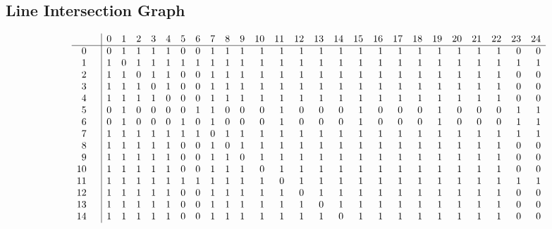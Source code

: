 \documentclass{article}
\begin{document}
{\subsection*{Line Intersection Graph}
{\arraycolsep=1pt
$$
\begin{array}{rr|*{25}r}
 &  & 0 & 1 & 2 & 3 & 4 & 5 & 6 & 7 & 8 & 9 & 10 & 11 & 12 & 13 & 14 & 15 & 16 & 17 & 18 & 19 & 20 & 21 & 22 & 23 & 24\\
\hline
0 &  & 0 & 1 & 1 & 1 & 1 & 0 & 0 & 1 & 1 & 1 & 1 & 1 & 1 & 1 & 1 & 1 & 1 & 1 & 1 & 1 & 1 & 1 & 1 & 0 & 0\\
1 &  & 1 & 0 & 1 & 1 & 1 & 1 & 1 & 1 & 1 & 1 & 1 & 1 & 1 & 1 & 1 & 1 & 1 & 1 & 1 & 1 & 1 & 1 & 1 & 1 & 1\\
2 &  & 1 & 1 & 0 & 1 & 1 & 0 & 0 & 1 & 1 & 1 & 1 & 1 & 1 & 1 & 1 & 1 & 1 & 1 & 1 & 1 & 1 & 1 & 1 & 0 & 0\\
3 &  & 1 & 1 & 1 & 0 & 1 & 0 & 0 & 1 & 1 & 1 & 1 & 1 & 1 & 1 & 1 & 1 & 1 & 1 & 1 & 1 & 1 & 1 & 1 & 0 & 0\\
4 &  & 1 & 1 & 1 & 1 & 0 & 0 & 0 & 1 & 1 & 1 & 1 & 1 & 1 & 1 & 1 & 1 & 1 & 1 & 1 & 1 & 1 & 1 & 1 & 0 & 0\\
5 &  & 0 & 1 & 0 & 0 & 0 & 0 & 1 & 1 & 0 & 0 & 0 & 1 & 0 & 0 & 0 & 1 & 0 & 0 & 0 & 1 & 0 & 0 & 0 & 1 & 1\\
6 &  & 0 & 1 & 0 & 0 & 0 & 1 & 0 & 1 & 0 & 0 & 0 & 1 & 0 & 0 & 0 & 1 & 0 & 0 & 0 & 1 & 0 & 0 & 0 & 1 & 1\\
7 &  & 1 & 1 & 1 & 1 & 1 & 1 & 1 & 0 & 1 & 1 & 1 & 1 & 1 & 1 & 1 & 1 & 1 & 1 & 1 & 1 & 1 & 1 & 1 & 1 & 1\\
8 &  & 1 & 1 & 1 & 1 & 1 & 0 & 0 & 1 & 0 & 1 & 1 & 1 & 1 & 1 & 1 & 1 & 1 & 1 & 1 & 1 & 1 & 1 & 1 & 0 & 0\\
9 &  & 1 & 1 & 1 & 1 & 1 & 0 & 0 & 1 & 1 & 0 & 1 & 1 & 1 & 1 & 1 & 1 & 1 & 1 & 1 & 1 & 1 & 1 & 1 & 0 & 0\\
10 &  & 1 & 1 & 1 & 1 & 1 & 0 & 0 & 1 & 1 & 1 & 0 & 1 & 1 & 1 & 1 & 1 & 1 & 1 & 1 & 1 & 1 & 1 & 1 & 0 & 0\\
11 &  & 1 & 1 & 1 & 1 & 1 & 1 & 1 & 1 & 1 & 1 & 1 & 0 & 1 & 1 & 1 & 1 & 1 & 1 & 1 & 1 & 1 & 1 & 1 & 1 & 1\\
12 &  & 1 & 1 & 1 & 1 & 1 & 0 & 0 & 1 & 1 & 1 & 1 & 1 & 0 & 1 & 1 & 1 & 1 & 1 & 1 & 1 & 1 & 1 & 1 & 0 & 0\\
13 &  & 1 & 1 & 1 & 1 & 1 & 0 & 0 & 1 & 1 & 1 & 1 & 1 & 1 & 0 & 1 & 1 & 1 & 1 & 1 & 1 & 1 & 1 & 1 & 0 & 0\\
14 &  & 1 & 1 & 1 & 1 & 1 & 0 & 0 & 1 & 1 & 1 & 1 & 1 & 1 & 1 & 0 & 1 & 1 & 1 & 1 & 1 & 1 & 1 & 1 & 0 & 0\\

\end{array}$$}}
\end{document}
